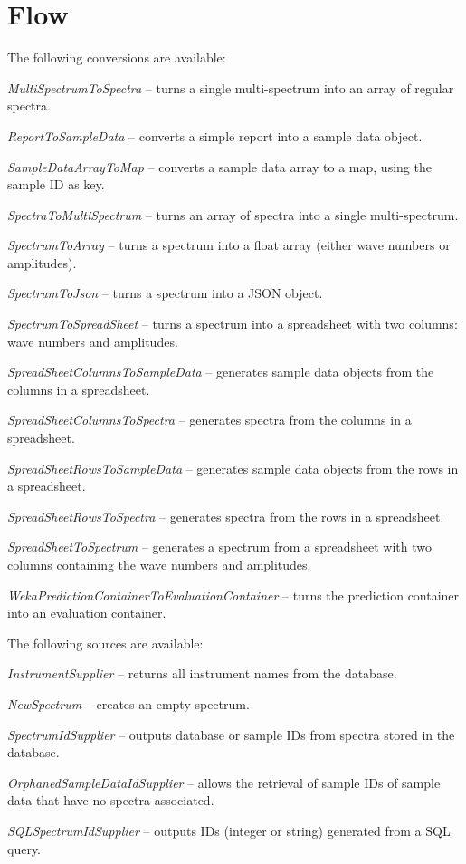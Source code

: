 \documentclass[a4paper]{book}
\begin{document}
\chapter{Flow}
The following conversions are available:
\begin{tight_itemize}
  \item \textit{MultiSpectrumToSpectra} -- turns a single multi-spectrum
  into an array of regular spectra.
  \item \textit{ReportToSampleData} -- converts a simple report into
  a sample data object.
  \item \textit{SampleDataArrayToMap} -- converts a sample data array to a map, using the sample ID as key.
  \item \textit{SpectraToMultiSpectrum} -- turns an array of spectra
  into a single multi-spectrum.
  \item \textit{SpectrumToArray} -- turns a spectrum into a float array
  (either wave numbers or amplitudes).
  \item \textit{SpectrumToJson} -- turns a spectrum into a JSON object.
  \item \textit{SpectrumToSpreadSheet} -- turns a spectrum into a spreadsheet
  with two columns: wave numbers and amplitudes.
  \item \textit{SpreadSheetColumnsToSampleData} -- generates sample data objects from the columns in a spreadsheet.
  \item \textit{SpreadSheetColumnsToSpectra} -- generates spectra from the columns in a spreadsheet.
  \item \textit{SpreadSheetRowsToSampleData} -- generates sample data objects from the rows in a spreadsheet.
  \item \textit{SpreadSheetRowsToSpectra} -- generates spectra from the rows in a spreadsheet.
  \item \textit{SpreadSheetToSpectrum} -- generates a spectrum from a spreadsheet
  with two columns containing the wave numbers and amplitudes.
  \item \textit{WekaPredictionContainerToEvaluationContainer} -- turns the
  prediction container into an evaluation container.
\end{tight_itemize}
The following sources are available:
\begin{tight_itemize}
  \item \textit{InstrumentSupplier} -- returns all instrument names from the
  database.
  \item \textit{NewSpectrum} -- creates an empty spectrum.
  \item \textit{SpectrumIdSupplier} -- outputs database or sample IDs from spectra
  stored in the database.
  \item \textit{OrphanedSampleDataIdSupplier} -- allows the retrieval of sample
  IDs of sample data that have no spectra associated.
  \item \textit{SQLSpectrumIdSupplier} -- outputs IDs (integer or string)
  generated from a SQL query.
\end{tight_itemize}
\end{document}
